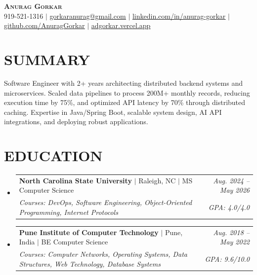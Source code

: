 \documentclass[letterpaper,11pt]{article}
\makeatletter
\newcommand{\resumeEduSubheading}[6]{
  \vspace{-2pt}\item
    \begin{tabular*}{0.97\textwidth}[t]{l@{\extracolsep{\fill}}r}
      \textbf{#1} $|$ #2 $|$ #3 & \textit{\small #4} \\
      \textit{\small #5} & \textit{\small #6} \\
    \end{tabular*}\vspace{-2pt}
}
\newcommand{\resumeSubHeadingListStart}{\begin{itemize}[leftmargin=0.15in, label={}]}
\newcommand{\resumeSubHeadingListEnd}{\end{itemize}}
\makeatother
\begin{document}
\begin{center}
    \textbf{\LARGE \scshape Anurag Gorkar} \\ \vspace{1pt}
    \small 919-521-1316 $|$ \href{mailto:gorkaranurag@gmail.com}{\underline{gorkaranurag@gmail.com}} $|$ 
    \href{https://linkedin.com/in/anurag-gorkar}{\underline{linkedin.com/in/anurag-gorkar}} $|$
    \href{https://github.com/AnuragGorkar}{\underline{github.com/AnuragGorkar}} $|$
    \href{https://adgorkar.vercel.app}{\underline{adgorkar.vercel.app}}
\end{center}

\section{SUMMARY}
\small{Software Engineer with 2+ years architecting distributed backend systems and microservices. Scaled data pipelines to process 200M+ monthly records, reducing execution time by 75\%, and optimized API latency by 70\% through distributed caching. Expertise in Java/Spring Boot, scalable system design, AI API integrations, and deploying robust applications.}

\section{EDUCATION}
  \resumeSubHeadingListStart
    \resumeEduSubheading
      {North Carolina State University}{Raleigh, NC}{MS Computer Science}
      {Aug. 2024 -- May 2026}
      {Courses: DevOps, Software Engineering, Object-Oriented Programming, Internet Protocols}
      {GPA: 4.0/4.0}
    
    \resumeEduSubheading
      {Pune Institute of Computer Technology}{Pune, India}{BE Computer Science}
      {Aug. 2018 -- May 2022}
      {Courses: Computer Networks, Operating Systems, Data Structures, Web Technology, Database Systems}
      {GPA: 9.6/10.0}
  \resumeSubHeadingListEnd
\end{document}
